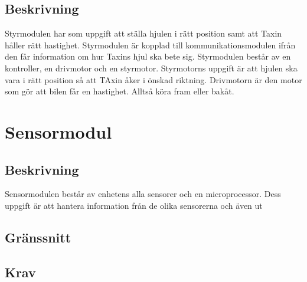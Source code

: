 \documentclass[kravspec/krav.tex]{subfiles}
\begin{document}
\subsection{Beskrivning}
Styrmodulen har som uppgift att ställa hjulen i rätt position samt att Taxin håller rätt hastighet. Styrmodulen är kopplad till kommunikationsmodulen ifrån den får information om hur Taxins hjul ska bete sig. Styrmodulen består av en kontroller, en drivmotor och en styrmotor. Styrmotorns uppgift är att hjulen ska vara i rätt position så att TAxin åker i önskad riktning. Drivmotorn är den motor som gör att bilen får en hastighet. Alltså köra fram eller bakåt.

\clearpage
\section{Sensormodul}
\subsection{Beskrivning}
Sensormodulen består av enhetens alla sensorer och en microprocessor. Dess
uppgift är att hantera information från de olika sensorerna och även
ut
\subsection{Gränssnitt}
\subsection{Krav}
\end{document}
